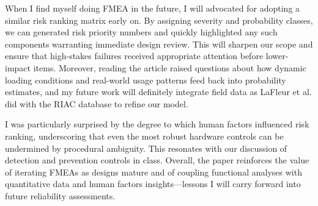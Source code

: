\begin{hwkProblem}{5}{}
When I find myself doing FMEA in the future, I will advocated for adopting a similar risk ranking matrix early on. By assigning severity and probability classes, we can generated risk priority numbers and quickly highlighted any such components warranting immediate design review. This will sharpen our scope and ensure that high-stakes failures received appropriate attention before lower-impact items. Moreover, reading the article raised questions about how dynamic loading conditions and real-world usage patterns feed back into probability estimates, and my future work will definitely integrate field data as LaFleur et al. did with the RIAC database to refine our model.

I was particularly surprised by the degree to which human factors influenced risk ranking, underscoring that even the most robust hardware controls can be undermined by procedural ambiguity. This resonates with our discussion of detection and prevention controls in class. Overall, the paper reinforces the value of iterating FMEAs as designs mature and of coupling functional analyses with quantitative data and human factors insights—lessons I will carry forward into future reliability assessments.

\end{hwkProblem}

